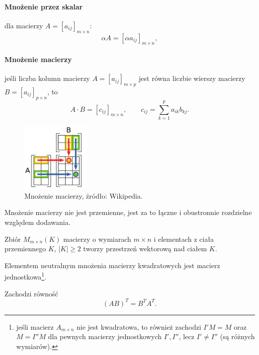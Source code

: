 \paragraph{Mnożenie przez skalar} dla macierzy $A = [a_{ij}]_{m \times n}$:
    \[ \alpha A = [\alpha a_{ij}]_{m \times n}, \]
\paragraph{Mnożenie macierzy} jeśli liczba kolumn macierzy $A = [a_{ij}]_{m \times p}$ jest równa liczbie wierszy macierzy $B = [a_{ij}]_{p \times n}$, to
    \[ A \cdot B = [c_{ij}]_{m \times n}, \qquad c_{ij} = \sum_{k=1}^p a_{ik}b_{kj}. \]

\begin{figure}[h]
    \centering
    \includegraphics[width=0.3\textwidth]{matrix_multiplication.pdf}
    \caption{Mnożenie macierzy, źródło: Wikipedia.}
\end{figure}

\begin{remark}
    Mnożenie macierzy nie jest przemienne, jest za to łączne i obustronnie rozdzielne względem dodawania.
\end{remark}

\begin{fact}
    Zbiór $M_{m \times n}(K)$ macierzy o wymiarach $m \times n$ i elementach z ciała przemiennego $K$, $|K| \geq 2$ tworzy przestrzeń wektorową nad ciałem $K$.
\end{fact}

\begin{fact}
    Elementem neutralnym mnożenia macierzy kwadratowych jest macierz jednostkowa\footnote{jeśli macierz $A_{m\times n}$ nie jest kwadratowa, to również zachodzi $I'M = M$ oraz $M = I''M$ dla pewnych macierzy jednostkowych $I', I''$, lecz $I' \neq I''$ (są różnych wymiarów).}.
\end{fact}

\begin{fact}
    Zachodzi równość
    \[ (AB)^T = B^T A^T. \]
\end{fact}

